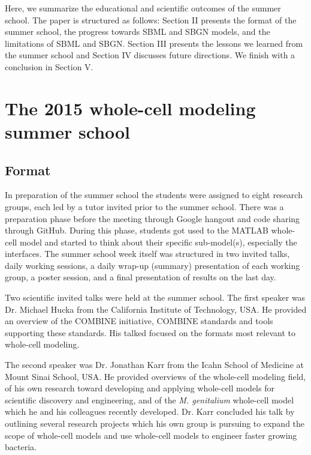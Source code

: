 \documentclass[journal,transmag]{IEEEtran}
\begin{document}
Here, we summarize the educational and scientific outcomes of the summer school. The paper is structured as follows: 
Section II presents the format of the summer school, the progress towards SBML and SBGN models, and the limitations of SBML and SBGN. 
Section III presents the lessons we learned from the summer school and Section IV discusses future directions. 
We finish with a conclusion in Section V. 


\section{The 2015 whole-cell modeling summer school}

\subsection{Format}
In preparation of the summer school the students were assigned to eight research groups, each led by a tutor invited prior to the summer school. 
There was a preparation phase before the meeting through Google hangout and code sharing through GitHub. During this phase, students got used to the MATLAB whole-cell model and started to think about their specific sub-model(s), especially the interfaces.
The summer school week itself was structured in two invited talks, daily working sessions, a daily wrap-up (summary) presentation of each working group, a poster session, and a final presentation of results on the last day.

Two scientific invited talks were held at the summer school. 
The first speaker was Dr. Michael Hucka from the California Institute of Technology, USA. 
He provided an overview of the COMBINE initiative, COMBINE standards and tools supporting these standards. 
His talked focused on the formats most relevant to whole-cell modeling. 

The second speaker was Dr. Jonathan Karr from the Icahn School of Medicine at Mount Sinai School, USA. 
He  provided overviews of the whole-cell modeling field, of his own research toward developing and applying whole-cell models for scientific discovery and engineering, and of the \textit{M. genitalium} whole-cell model which he and his colleagues recently developed.
Dr. Karr concluded his talk by outlining several research projects which his own group is pursuing to expand the scope of whole-cell models and use whole-cell models to engineer faster growing bacteria.
\end{document}
